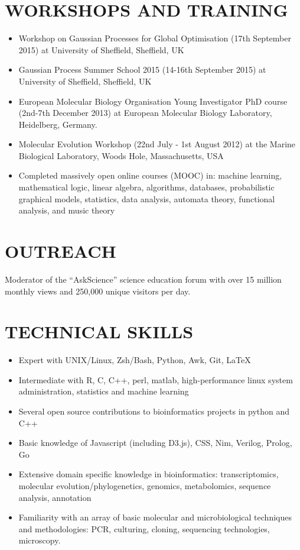 \documentclass{res}
\begin{document}
\begin{resume}
  \section{WORKSHOPS AND TRAINING}
  \begin{itemize}
          \vspace{-1pt}
      \item Workshop on Gaussian Processes for Global Optimisation (17th September 2015) at University of Sheffield, Sheffield, UK
      \item Gaussian Process Summer School 2015 (14-16th September 2015) at University of Sheffield, Sheffield, UK
      \item European Molecular Biology Organisation Young Investigator PhD course (2nd-7th December 2013) at European Molecular Biology Laboratory, Heidelberg, Germany.
\item Molecular Evolution Workshop (22nd July - 1st August 2012)
    at the Marine Biological Laboratory, Woods Hole, Massachusetts, USA
  \item Completed massively open online courses (MOOC) in: machine learning, mathematical logic, linear algebra, algorithms, databases, probabilistic graphical models, statistics, data analysis, automata theory, 
         functional analysis, and music theory
\end{itemize}
  

 \section{OUTREACH}          
 \vspace{5pt}
Moderator of the ``AskScience'' science education forum with over 15 million monthly views and 250,000 unique visitors per day.
\vspace{-5pt}


 \section{TECHNICAL SKILLS}
          \vspace{-1pt}
 \begin{itemize}
\item Expert with UNIX/Linux, Zsh/Bash, Python, Awk, Git, \LaTeX
\item Intermediate with R, C, C++, perl, matlab, high-performance linux system administration, statistics and machine learning
\item Several open source contributions to bioinformatics projects in python and C++ 
\item Basic knowledge of Javascript (including D3.js), CSS, Nim, Verilog, Prolog, Go
\item Extensive domain specific knowledge in bioinformatics: transcriptomics, molecular evolution/phylogenetics, genomics, metabolomics, sequence analysis, annotation
\item Familiarity with an array of basic molecular and microbiological techniques and methodologies: PCR, culturing, cloning, sequencing technologies, microscopy.
     

\end{itemize}
\end{resume}
\end{document}
